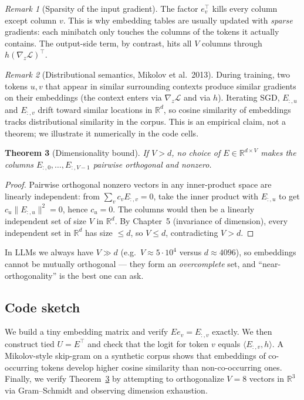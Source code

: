 \documentclass[11pt]{article}
\newtheorem{theorem}{Theorem}[section]
\theoremstyle{remark}
\newtheorem{remark}[theorem]{Remark}
\begin{document}
\begin{remark}[Sparsity of the input gradient]
The factor $e_v^\top$ kills every column except column $v$. This is why embedding tables are usually updated with \emph{sparse} gradients: each minibatch only touches the columns of the tokens it actually contains. The output-side term, by contrast, hits all $V$ columns through $h(\nabla_z\mathcal{L})^\top$.
\end{remark}

\begin{remark}[Distributional semantics, Mikolov et al.\ 2013]
During training, two tokens $u,v$ that appear in similar surrounding contexts produce similar gradients on their embeddings (the context enters via $\nabla_z\mathcal{L}$ and via $h$). Iterating SGD, $E_{:,u}$ and $E_{:,v}$ drift toward similar locations in $\mathbb{R}^d$, so cosine similarity of embeddings tracks distributional similarity in the corpus. This is an empirical claim, not a theorem; we illustrate it numerically in the code cells.
\end{remark}

\begin{theorem}[Dimensionality bound]\label{thm:dim}
If $V>d$, no choice of $E\in\mathbb{R}^{d\times V}$ makes the columns $E_{:,0},\dots,E_{:,V-1}$ pairwise orthogonal and nonzero.
\end{theorem}

\begin{proof}
Pairwise orthogonal nonzero vectors in any inner-product space are linearly independent: from $\sum_v c_v E_{:,v}=0$, take the inner product with $E_{:,u}$ to get $c_u\|E_{:,u}\|^2=0$, hence $c_u=0$. The columns would then be a linearly independent set of size $V$ in $\mathbb{R}^d$. By Chapter~5 (invariance of dimension), every independent set in $\mathbb{R}^d$ has size $\le d$, so $V\le d$, contradicting $V>d$.
\end{proof}

In LLMs we always have $V\gg d$ (e.g.\ $V\approx 5\cdot 10^4$ versus $d\approx 4096$), so embeddings cannot be mutually orthogonal --- they form an \emph{overcomplete} set, and ``near-orthogonality'' is the best one can ask.

\subsection*{Code sketch}

We build a tiny embedding matrix and verify $E e_v=E_{:,v}$ exactly. We then construct tied $U=E^\top$ and check that the logit for token $v$ equals $\langle E_{:,v},h\rangle$. A Mikolov-style skip-gram on a synthetic corpus shows that embeddings of co-occurring tokens develop higher cosine similarity than non-co-occurring ones. Finally, we verify Theorem~\ref{thm:dim} by attempting to orthogonalize $V=8$ vectors in $\mathbb{R}^3$ via Gram--Schmidt and observing dimension exhaustion.
\end{document}
